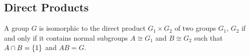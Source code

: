 \subsection{Direct Products}
\begin{proposition}
	A group $G$ is isomorphic to the direct product $G_1 \times G_2$ of two groups $G_1$, $G_2$ if and only if it contains normal subgroups $A \cong G_1$ and $B \cong G_2$ such that $A \cap B = \cbr[0]{1}$ and $AB = G$.
\end{proposition}
